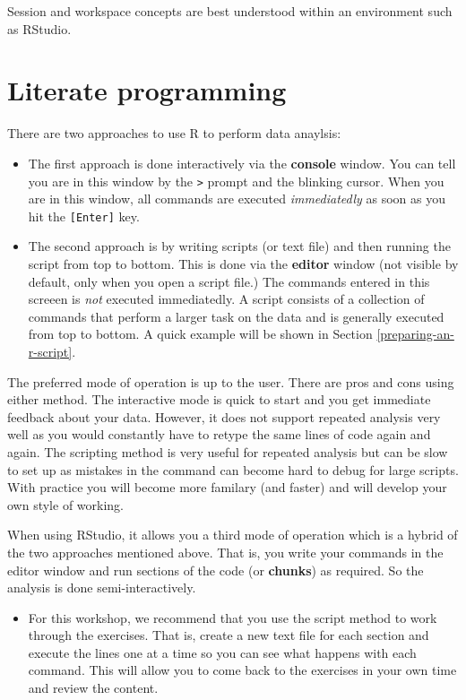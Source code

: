 \documentclass[a4paper]{book}
\providecommand{\tightlist}{%
  \setlength{\itemsep}{0pt}\setlength{\parskip}{0pt}}
\newenvironment{rmdblock}[1]
  {\vspace{1.5em}\begin{shaded*}
  \begin{itemize}
  \renewcommand{\labelitemi}{
    \raisebox{-.7\height}[0pt][0pt]{
      {\setkeys{Gin}{width=3em,keepaspectratio}\texttt{[image: images/\#1]}}
    }
  }
  \item
  }
  {
  \end{itemize}
  \end{shaded*}
  }
\newenvironment{rmdtip}
  {\begin{rmdblock}{tip}}
  {\end{rmdblock}}
\begin{document}
Session and workspace concepts are best understood within an environment
such as RStudio.

\section{Literate programming}\label{literate-programming}

There are two approaches to use R to perform data anaylsis:

\begin{itemize}
\tightlist
\item
  The first approach is done interactively via the \textbf{console}
  window. You can tell you are in this window by the
  \texttt{\textgreater{}} prompt and the blinking cursor. When you are
  in this window, all commands are executed \emph{immediatedly} as soon
  as you hit the \texttt{{[}Enter{]}} key.
\item
  The second approach is by writing scripts (or text file) and then
  running the script from top to bottom. This is done via the
  \textbf{editor} window (not visible by default, only when you open a
  script file.) The commands entered in this screeen is \emph{not}
  executed immediatedly. A script consists of a collection of commands
  that perform a larger task on the data and is generally executed from
  top to bottom. A quick example will be shown in Section
  \ref{preparing-an-r-script}.
\end{itemize}

The preferred mode of operation is up to the user. There are pros and
cons using either method. The interactive mode is quick to start and you
get immediate feedback about your data. However, it does not support
repeated analysis very well as you would constantly have to retype the
same lines of code again and again. The scripting method is very useful
for repeated analysis but can be slow to set up as mistakes in the
command can become hard to debug for large scripts. With practice you
will become more familary (and faster) and will develop your own style
of working.

When using RStudio, it allows you a third mode of operation which is a
hybrid of the two approaches mentioned above. That is, you write your
commands in the editor window and run sections of the code (or
\textbf{chunks}) as required. So the analysis is done
semi-interactively.

\begin{rmdtip}
For this workshop, we recommend that you use the script method to work
through the exercises. That is, create a new text file for each section
and execute the lines one at a time so you can see what happens with
each command. This will allow you to come back to the exercises in your
own time and review the content.
\end{rmdtip}
\end{document}
